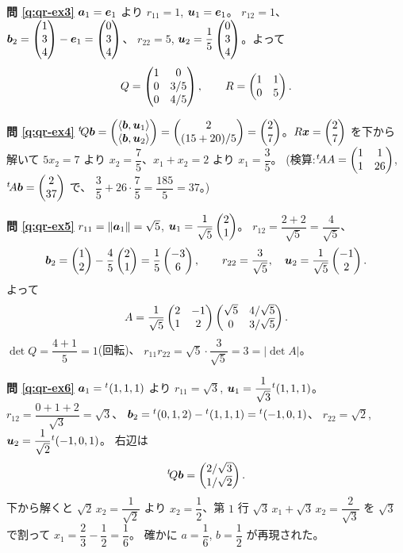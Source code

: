 \bigskip
\noindent\textbf{問 \ref{q:qr-ex3}}\quad
$\bm{a}_1 = \bm{e}_1$ より $r_{11} = 1$, $\bm{u}_1 = \bm{e}_1$。
$r_{12} = 1$、
$\bm{b}_2 = \begin{pmatrix}1 \\ 3 \\ 4\end{pmatrix} - \bm{e}_1 = \begin{pmatrix}0 \\ 3 \\ 4\end{pmatrix}$、
$r_{22} = 5$, $\bm{u}_2 = \dfrac{1}{5}\begin{pmatrix}0 \\ 3 \\ 4\end{pmatrix}$。よって
\[
Q = \begin{pmatrix}1 & 0 \\ 0 & 3/5 \\ 0 & 4/5\end{pmatrix}, \qquad R = \begin{pmatrix}1 & 1 \\ 0 & 5\end{pmatrix}.
\]

\bigskip
\noindent\textbf{問 \ref{q:qr-ex4}}\quad
${}^t\!Q\bm{b} = \begin{pmatrix}\langle \bm{b}, \bm{u}_1 \rangle \\
\langle \bm{b}, \bm{u}_2 \rangle\end{pmatrix} = \begin{pmatrix}2 \\ (15 + 20)/5\end{pmatrix}
= \begin{pmatrix}2 \\ 7\end{pmatrix}$。$R\bm{x} = \begin{pmatrix}2 \\ 7\end{pmatrix}$ を下から解いて
$5x_2 = 7$ より $x_2 = \dfrac{7}{5}$、$x_1 + x_2 = 2$ より
$x_1 = \dfrac{3}{5}$。
(検算:${}^t\!AA = \begin{pmatrix}1 & 1 \\ 1 & 26\end{pmatrix}$,
${}^t\!A\bm{b} = \begin{pmatrix}2 \\ 37\end{pmatrix}$ で、
$\dfrac{3}{5} + 26 \cdot \dfrac{7}{5} = \dfrac{185}{5} = 37$。)

\bigskip
\noindent\textbf{問 \ref{q:qr-ex5}}\quad
$r_{11} = \|\bm{a}_1\| = \sqrt{5}$,
$\bm{u}_1 = \dfrac{1}{\sqrt{5}}\begin{pmatrix}2 \\ 1\end{pmatrix}$。
$r_{12} = \dfrac{2 + 2}{\sqrt{5}} = \dfrac{4}{\sqrt{5}}$、
\[
\bm{b}_2 = \begin{pmatrix}1 \\ 2\end{pmatrix} - \frac{4}{5}\begin{pmatrix}2 \\ 1\end{pmatrix}
= \frac{1}{5}\begin{pmatrix}-3 \\ 6\end{pmatrix}, \qquad
r_{22} = \frac{3}{\sqrt{5}}, \quad
\bm{u}_2 = \frac{1}{\sqrt{5}}\begin{pmatrix}-1 \\ 2\end{pmatrix}.
\]
よって
\[
A = \frac{1}{\sqrt{5}}\begin{pmatrix}2 & -1 \\ 1 & 2\end{pmatrix}
\begin{pmatrix}\sqrt{5} & 4/\sqrt{5} \\ 0 & 3/\sqrt{5}\end{pmatrix}.
\]
$\det Q = \dfrac{4 + 1}{5} = 1$(回転)、
$r_{11}r_{22} = \sqrt{5} \cdot \dfrac{3}{\sqrt{5}} = 3 = |\det A|$。

\bigskip
\noindent\textbf{問 \ref{q:qr-ex6}}\quad
$\bm{a}_1 = {}^t(1,1,1)$ より $r_{11} = \sqrt{3}$,
$\bm{u}_1 = \dfrac{1}{\sqrt{3}}{}^t(1,1,1)$。
$r_{12} = \dfrac{0 + 1 + 2}{\sqrt{3}} = \sqrt{3}$、
$\bm{b}_2 = {}^t(0,1,2) - {}^t(1,1,1) = {}^t(-1,0,1)$、
$r_{22} = \sqrt{2}$, $\bm{u}_2 = \dfrac{1}{\sqrt{2}}{}^t(-1,0,1)$。
右辺は
\[
{}^t\!Q\bm{b} = \begin{pmatrix}2/\sqrt{3} \\ 1/\sqrt{2}\end{pmatrix}.
\]
下から解くと $\sqrt{2}\,x_2 = \dfrac{1}{\sqrt{2}}$ より
$x_2 = \dfrac{1}{2}$、第 $1$ 行 $\sqrt{3}\,x_1 + \sqrt{3}\,x_2
= \dfrac{2}{\sqrt{3}}$ を $\sqrt{3}$ で割って
$x_1 = \dfrac{2}{3} - \dfrac{1}{2} = \dfrac{1}{6}$。
確かに $a = \dfrac{1}{6}$, $b = \dfrac{1}{2}$ が再現された。

